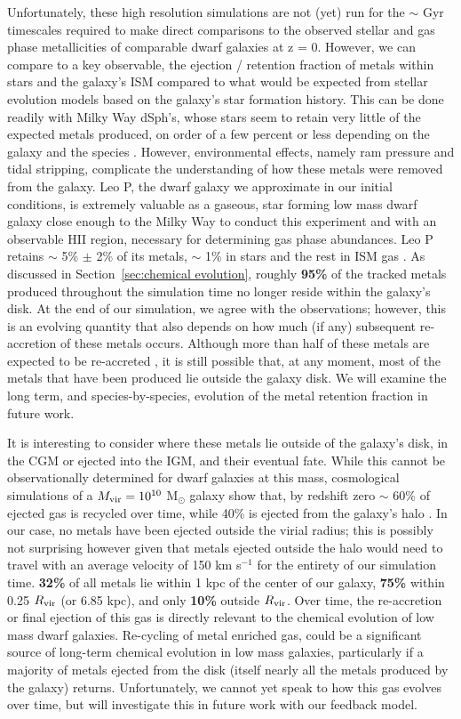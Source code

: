 \documentclass[twocolumn]{aastex61}
\begin{document}
Unfortunately, these high resolution simulations are not (yet) run for the $\sim$ Gyr timescales required to make direct comparisons to the observed stellar and gas phase metallicities of comparable dwarf galaxies at z = 0. However, we can compare to a key observable, the ejection / retention fraction of metals within stars and the galaxy's ISM compared to what would be expected from stellar evolution models based on the galaxy's star formation history. This can be done readily with Milky Way dSph's, whose stars seem to retain very little of the expected metals produced, on order of a few percent or less depending on the galaxy and the species \citep{Kirby2011-metals}. However, environmental effects, namely ram pressure and tidal stripping, complicate the understanding of how these metals were removed from the galaxy. Leo P, the dwarf galaxy we approximate in our initial conditions, is extremely valuable as a gaseous, star forming low mass dwarf galaxy close enough to the Milky Way to conduct this experiment and with an observable HII region, necessary for determining gas phase abundances. Leo P retains $\sim$ 5\% $\pm$ 2\% of its metals, $\sim$ 1\% in stars and the rest in ISM gas \citep{McQuinn2015}. As discussed in Section~\ref{sec:chemical evolution}, roughly \textbf{95\%} of the tracked metals produced throughout the simulation time no longer reside within the galaxy's disk. At the end of our simulation, we agree with the observations; however, this is an evolving quantity that also depends on how much (if any) subsequent re-accretion of these metals occurs. Although more than half of these metals are expected to be re-accreted \citep{Angles-Alcazar2017}, it is still possible that, at any moment, most of the metals that have been produced lie outside the galaxy disk. We will examine the long term, and species-by-species, evolution of the metal retention fraction in future work.

It is interesting to consider where these metals lie outside of the galaxy's disk, in the CGM or ejected into the IGM, and their eventual fate. While this cannot be observationally determined for dwarf galaxies at this mass, cosmological simulations of a $M_{\rm vir} = 10^{10}$ M$_{\odot}$ galaxy show that, by redshift zero $\sim$ 60\% of ejected gas is recycled over time, while 40\% is ejected from the galaxy's halo \citep{Angles-Alcazar2017}. In our case, no metals have been ejected outside the virial radius; this is possibly not surprising however given that metals ejected outside the halo would need to travel with an average velocity of 150 km s$^{-1}$ for the entirety of our simulation time. \textbf{32\%} of all metals lie within 1 kpc of the center of our galaxy, \textbf{75\%} within 0.25 $R_{\rm vir}$ (or 6.85 kpc), and only \textbf{10\%} outside $R_{\rm vir}$. Over time, the re-accretion or final ejection of this gas is directly relevant to the chemical evolution of low mass dwarf galaxies. Re-cycling of metal enriched gas, could be a significant source of long-term chemical evolution in low mass galaxies, particularly if a majority of metals ejected from the disk (itself nearly all the metals produced by the galaxy) returns. Unfortunately, we cannot yet speak to how this gas evolves over time, but will investigate this in future work with our feedback model.
\end{document}
